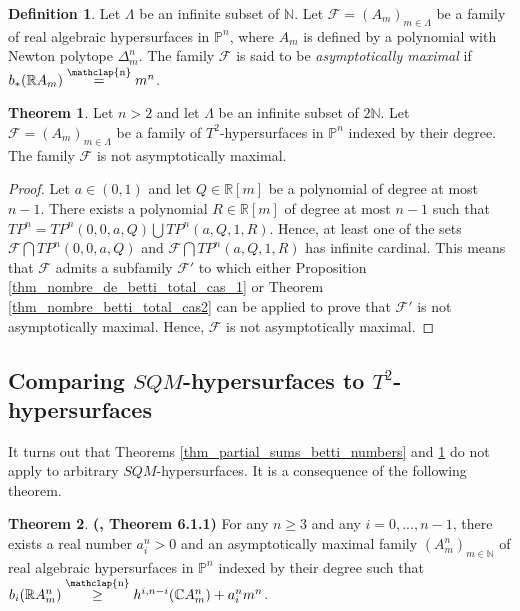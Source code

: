 \documentclass[12pt]{article}
\newcommand\customeq{\stackrel{\mathclap{\normalfont\scriptsize\mbox{n}}}{=}}
\newcommand\customgeq{\stackrel{\mathclap{\normalfont\scriptsize\mbox{n}}}{\geq}}
\newcommand{\R}{\mathbb{R}}
\newcommand{\C}{\mathbb{C}}
\renewcommand{\P}{\mathbb{P}}
\newcommand{\N}{\mathbb{N}}
\theoremstyle{definition}
\newtheorem{defin}{Definition}[section]
\newtheorem{thm}{Theorem}[section]
\begin{document}
\begin{defin}
    Let $\Lambda$ be an infinite subset of $\mathbb{N}$.
    Let $\mathcal{F} = (A_m)_{m \in \Lambda}$ be a family of real algebraic hypersurfaces in $\P^n$, where $A_m$ is defined by a polynomial with Newton polytope $\Delta_m^n$. The family $\mathcal{F}$ is said to be \textit{asymptotically maximal} if $b_*(\mathbb{R}A_m) \customeq m^n$.
\end{defin}

\begin{thm}
    \label{main_theorem}
    Let $n >2$ and let $\Lambda$ be an infinite subset of $2\mathbb{N}$.
    Let $\mathcal{F} = (A_m)_{m \in \Lambda}$ be a family of $T^2$-hypersurfaces in $\P^n$ indexed by their degree. The family $\mathcal{F}$ is not asymptotically maximal.
\end{thm}

\begin{proof}
    Let $a\in (0,1)$ and let $Q \in \mathbb{R}[m]$ be a polynomial of degree at most $n-1$. There exists a polynomial $R \in \mathbb{R}[m]$ of degree at most $n-1$ such that $TP^n = TP^n(0,0,a,Q) \bigcup TP^n(a,Q,1,R)$. Hence, at least one of the sets $\mathcal{F} \bigcap TP^n(0,0,a,Q)$ and $\mathcal{F} \bigcap TP^n(a,Q,1,R)$ has infinite cardinal.
    This means that $\mathcal{F}$ admits a subfamily $\mathcal{F}'$ to which either Proposition \ref{thm_nombre_de_betti_total_cas_1} or Theorem \ref{thm_nombre_betti_total_cas2} can be applied to prove that $\mathcal{F}'$ is not asymptotically maximal. Hence, $\mathcal{F}$ is not asymptotically maximal.
\end{proof}

\subsection{Comparing $SQM$-hypersurfaces to $T^2$-hypersurfaces}

\begin{sloppypar}
    It turns out that Theorems \ref{thm_partial_sums_betti_numbers} and \ref{main_theorem} do not apply to arbitrary $SQM$-hypersurfaces. It is a consequence of the following theorem.
\end{sloppypar}

\begin{thm}
    \textbf{(\cite{thesearnal}, Theorem 6.1.1)} For any $n \geq 3$ and any $i = 0,...,n-1$, there exists a real number $a_i^n > 0$ and an asymptotically maximal family $(A_m^n)_{m \in \N}$ of real algebraic hypersurfaces in $\P^n$ indexed by their degree such that $b_i(\R A_m^n) \customgeq h^{i,n-i}(\C A_m^n) + a_i^n m^n$.
\end{thm}
\end{document}
